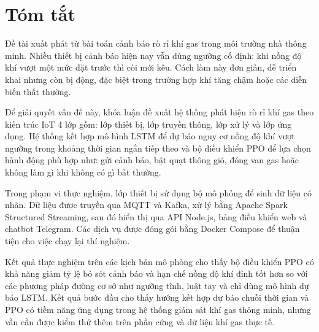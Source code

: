 \chapter*{Tóm tắt}
Đề tài xuất phát từ bài toán cảnh báo rò rỉ khí gas trong môi trường nhà thông minh. Nhiều thiết bị cảnh báo hiện nay vẫn dùng ngưỡng cố định: khi nồng độ khí vượt một mức đặt trước thì còi mới kêu. Cách làm này đơn giản, dễ triển khai nhưng còn bị động, đặc biệt trong trường hợp khí tăng chậm hoặc các diễn biến thất thường.

Để giải quyết vấn đề này, khóa luận đề xuất hệ thống phát hiện rò rỉ khí gas theo kiến trúc IoT 4 lớp gồm: lớp thiết bị, lớp truyền thông, lớp xử lý và lớp ứng dụng. Hệ thống kết hợp mô hình LSTM để dự báo nguy cơ nồng độ khí vượt ngưỡng trong khoảng thời gian ngắn tiếp theo và bộ điều khiển PPO để lựa chọn hành động phù hợp như: gửi cảnh báo, bật quạt thông gió, đóng van gas hoặc không làm gì khi không có gì bất thường.

Trong phạm vi thực nghiệm, lớp thiết bị sử dụng bộ mô phỏng để sinh dữ liệu có nhãn. Dữ liệu được truyền qua MQTT và Kafka, xử lý bằng Apache Spark Structured Streaming, sau đó hiển thị qua API Node.js, bảng điều khiển web và chatbot Telegram. Các dịch vụ được đóng gói bằng Docker Compose để thuận tiện cho việc chạy lại thí nghiệm.

Kết quả thực nghiệm trên các kịch bản mô phỏng cho thấy bộ điều khiển PPO có khả năng giảm tỷ lệ bỏ sót cảnh báo và hạn chế nồng độ khí đỉnh tốt hơn so với các phương pháp đường cơ sở như ngưỡng tĩnh, luật tay và chỉ dùng mô hình dự báo LSTM. Kết quả bước đầu cho thấy hướng kết hợp dự báo chuỗi thời gian và PPO có tiềm năng ứng dụng trong hệ thống giám sát khí gas thông minh, nhưng vẫn cần được kiểm thử thêm trên phần cứng và dữ liệu khí gas thực tế.
